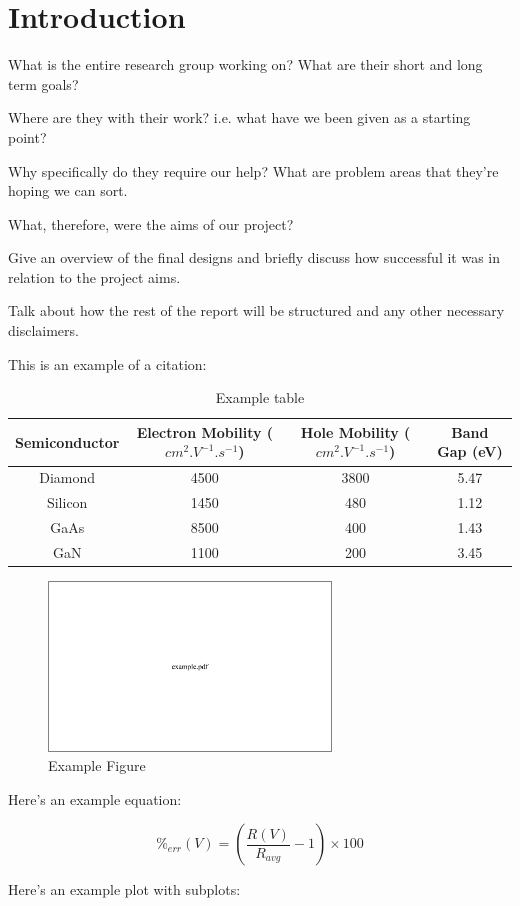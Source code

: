 \newpage
\section{Introduction}
\label{sec:intro}

What is the entire research group working on? What are their short and long term goals?

Where are they with their work? i.e. what have we been given as a starting point?

Why specifically do they require our help? What are problem areas that they're hoping we can sort.

What, therefore, were the aims of our project?

Give an overview of the final designs and briefly discuss how successful it was in relation to the project aims.

Talk about how the rest of the report will be structured and any other necessary disclaimers.



This is an example of a citation: \cite{lin_koizumi_yater_koeck_2014, emission_suppression_08}



\begin{table}[ht]
\centering
 \begin{tabular}{| c | c | c | c |}
 \hline
 Semiconductor & Electron Mobility ($cm^2.V^{-1}.s^{-1}$) & Hole Mobility ($cm^2.V^{-1}.s^{-1}$) & Band Gap (eV) \\ %
 \hline\hline
 Diamond & 4500 & 3800 & 5.47\\
 Silicon & 1450 & 480 & 1.12\\
 GaAs & 8500 & 400 & 1.43\\
 GaN & 1100 & 200 & 3.45\\
 \hline
\end{tabular}
\caption{Example table}
\label{tab:example}
\end{table}




\begin{figure}[!htb]
  \centering
  \includegraphics[width=0.67\textwidth]{Figures/example.pdf}
  \caption{Example Figure}
  \label{fig:example}
\end{figure}

Here's an example equation:

\begin{center}
\begin{equation}
\%_{err}(V) = \left(\frac{R(V)}{R_{avg}}-1\right)\times100
\end{equation}
\end{center}

Here's an example plot with subplots:


